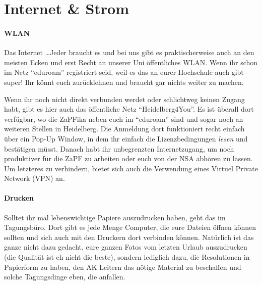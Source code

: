 
\section{Internet \& Strom}
\paragraph{WLAN}
Das Internet \dots Jeder braucht es und bei uns gibt es praktischerweise auch an den meisten Ecken und erst Recht an unserer Uni öffentliches WLAN. Wenn ihr schon im Netz ``eduroam'' registriert seid, weil es das an eurer Hochschule auch gibt - super! Ihr könnt euch zurücklehnen und braucht gar nichts weiter zu machen.

Wenn ihr noch nicht direkt verbunden werdet oder schlichtweg keinen Zugang habt, gibt es hier auch das öffentliche Netz ``Heidelberg4You''. Es ist überall dort verfügbar, wo die ZaPFika neben euch im ``eduroam'' sind und sogar noch an weiteren Stellen in Heidelberg. Die Anmeldung dort funktioniert recht einfach über ein Pop-Up Window, in dem ihr einfach die Lizenzbedingungen \textit{lesen} und bestätigen müsst. Danach habt ihr unbegrenzten Internetzugang, um noch produktiver für die ZaPF zu arbeiten oder euch von der NSA abhören zu lassen. Um letzteres zu verhindern, bietet sich auch die Verwendung eines Virtuel Private Network (VPN) an.

\paragraph{Drucken}
Solltet ihr mal lebenswichtige Papiere auszudrucken haben, geht das im Tagungsbüro. Dort gibt es jede Menge Computer, die eure Dateien öffnen können sollten und sich auch mit den Druckern dort verbinden können. Natürlich ist das ganze nicht dazu gedacht, eure ganzen Fotos vom letzten Urlaub auszudrucken (die Qualität ist eh nicht die beste), sondern lediglich dazu, die Resolutionen in Papierform zu haben, den AK Leitern das nötige Material zu beschaffen und solche Tagungsdinge eben, die anfallen.

